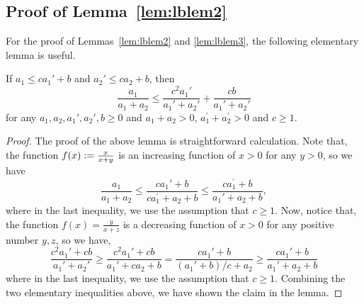 \subsection{Proof of Lemma~\ref{lem:lblem2}}
\label{sec:proof-lblem2}
For the proof of Lemmas~\ref{lem:lblem2} and \ref{lem:lblem3}, the following elementary lemma is useful.
\begin{lemma}
	\label{lem:elem-ineq}
	If $a_1 \leq c a_1' + b$ and $a_2' \leq ca_2 + b$, then
	\begin{equation*}
		\frac{a_1}{a_1+a_2} \leq \frac{c^2 a_1'}{a_1'+a_2'} + \frac{cb}{a_1' + a_2'}
	\end{equation*}
	for any $a_1, a_2, a_1', a_2', b \geq 0$ and $a_1+a_2 > 0$, $a_1^\prime + a_2^\prime > 0$ and $c \geq 1$.
\end{lemma} 
\begin{proof}
	The proof of the above lemma is straightforward calculation. Note that, the function 
	$f(x) := \frac{x}{x+y}$ is an increasing function of $x > 0$ for any $y > 0$, so we have 
	\begin{equation*}
		\frac{a_1}{a_1 + a_2} \leq \frac{c a_1'+b}{c a_1^\prime + a_2 + b} 
		\leq \frac{c a_1^\prime+b}{a_1' + a_2 + b}, 
	\end{equation*}
	where in the last inequality, we use the assumption that $c \geq 1$.
	Now, notice that, the function $f(x) = \frac{y}{x + z}$ is a decreasing function of 
	$x > 0$ for any positive number $y, z$, so we have,  
	\begin{equation*}
		\frac{c^2 a_1' + cb}{a_1'+a_2'} \geq \frac{c^2 a_1'+cb}{a_1' + c a_2 + b} 
		= \frac{c a_1'+b}{ (a_1' + b)/ c + a_2} \geq \frac{c a_1'+b}{ a_1' + a_2 + b} 
	\end{equation*}
	where in the last inequality, we use the assumption that $c \geq 1$. Combining the two 
	elementary inequalities above, we have shown the claim in the lemma. 
\end{proof}

